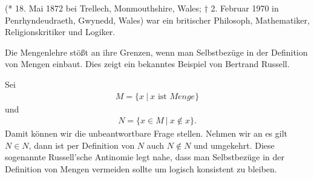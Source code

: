 \documentclass[letterpaper,10pt,english]{jupyterBook}
\begin{document}
\begin{sphinxShadowBox}

 (* 18. Mai 1872 bei Trellech, Monmouthshire, Wales; † 2. Februar 1970 in Penrhyndeudraeth, Gwynedd, Wales) war ein britischer Philosoph, Mathematiker, Religionskritiker und Logiker.
\end{sphinxShadowBox}

Die Mengenlehre stößt an ihre Grenzen, wenn man Selbstbezüge in der Definition von Mengen einbaut. Dies zeigt ein bekanntes Beispiel von Bertrand Russell.

Sei
\begin{equation*}
\begin{split} M=\{ x ~|~x \text{ ist } Menge \}\end{split}
\end{equation*}
und
\begin{equation*}
\begin{split}N = \{x \in M~|~x \notin x\}.\end{split}
\end{equation*}
Damit können wir die unbeantwortbare Frage  stellen. Nehmen wir an es gilt \(N \in N\), dann ist per Definition von \(N\) auch \(N \notin N\) und umgekehrt. Diese sogenannte Russell’sche Antinomie legt nahe, dass man Selbstbezüge in der Definition von Mengen vermeiden sollte um logisch konsistent zu bleiben.
\end{document}
